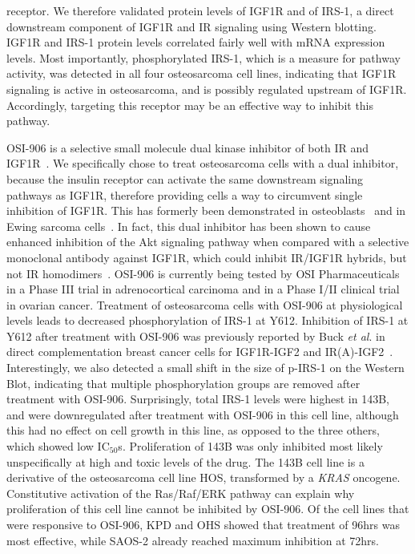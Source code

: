 receptor. We therefore validated protein levels of IGF1R and of IRS-1, a direct downstream component of IGF1R and IR signaling using Western blotting. IGF1R and IRS-1 protein levels correlated fairly well with mRNA expression levels. Most importantly, phosphorylated IRS-1, which is a measure for pathway activity, was detected in all four osteosarcoma cell lines, indicating that IGF1R signaling is active in osteosarcoma, and is possibly regulated upstream of IGF1R. Accordingly, targeting this receptor may be an effective way to inhibit this pathway.

OSI-906 is a selective small molecule dual kinase inhibitor of both IR and IGF1R~\cite{mulvihill2009discovery}. We specifically chose to treat osteosarcoma cells with a dual inhibitor, because the insulin receptor can activate the same downstream signaling pathways as IGF1R, therefore providing cells a way to circumvent single inhibition of IGF1R. This has formerly been demonstrated in osteoblasts~\cite{fulzele2007disruption} and in Ewing sarcoma cells~\cite{garofalo2011efficacy}. In fact, this dual inhibitor has been shown to cause enhanced inhibition of the Akt signaling pathway when compared with a selective monoclonal antibody against IGF1R, which could inhibit IR/IGF1R hybrids, but not IR homodimers~\cite{buck2010compensatory}. OSI-906 is currently being tested by OSI Pharmaceuticals in a Phase III trial in adrenocortical carcinoma and in a Phase I/II clinical trial in ovarian cancer. Treatment of osteosarcoma cells with OSI-906 at physiological levels leads to decreased phosphorylation of IRS-1 at Y612. Inhibition of IRS-1 at Y612 after treatment with OSI-906 was previously reported by Buck {\it et al}. in direct complementation breast cancer cells for IGF1R-IGF2 and IR(A)-IGF2~\cite{buck2010compensatory}. Interestingly, we also detected a small shift in the size of p-IRS-1 on the Western Blot, indicating that multiple phosphorylation groups are removed after treatment with OSI-906. Surprisingly, total IRS-1 levels were highest in 143B, and were downregulated after treatment with OSI-906 in this cell line, although this had no effect on cell growth in this line, as opposed to the three others, which showed low IC$_{50}$s. Proliferation of 143B was only inhibited most likely unspecifically at high and toxic levels of the drug. The 143B cell line is a derivative of the osteosarcoma cell line HOS, transformed by a {\it KRAS} oncogene. Constitutive activation of the Ras/Raf/ERK pathway can explain why proliferation of this cell line cannot be inhibited by OSI-906. Of the cell lines that were responsive to OSI-906, KPD and OHS showed that treatment of 96hrs was most effective, while SAOS-2 already reached maximum inhibition at 72hrs.

